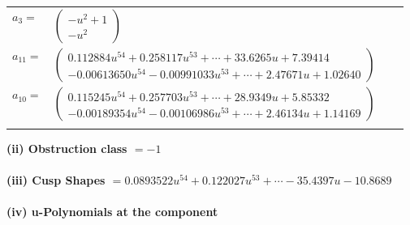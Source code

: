 \documentclass[1p]{elsarticle_modified}
\theoremstyle{definition}
\begin{document}
\begin{tabular}{m{7pt} m{180pt} m{7pt} m{180pt} }
\flushright $a_{3}=$&$\begin{pmatrix}- u^2+1\\- u^2\end{pmatrix}$ \\
\flushright $a_{11}=$&$\begin{pmatrix}0.112884 u^{54}+0.258117 u^{53}+\cdots+33.6265 u+7.39414\\-0.00613650 u^{54}-0.00991033 u^{53}+\cdots+2.47671 u+1.02640\end{pmatrix}$ \\
\flushright $a_{10}=$&$\begin{pmatrix}0.115245 u^{54}+0.257703 u^{53}+\cdots+28.9349 u+5.85332\\-0.00189354 u^{54}-0.00106986 u^{53}+\cdots+2.46134 u+1.14169\end{pmatrix}$\\&\end{tabular}
\flushleft \textbf{(ii) Obstruction class $= -1$}\\~\\
\flushleft \textbf{(iii) Cusp Shapes $= 0.0893522 u^{54}+0.122027 u^{53}+\cdots-35.4397 u-10.8689$}\\~\\
\newpage\renewcommand{\arraystretch}{1}
\flushleft \textbf{(iv) u-Polynomials at the component}\newline \\
\end{document}
